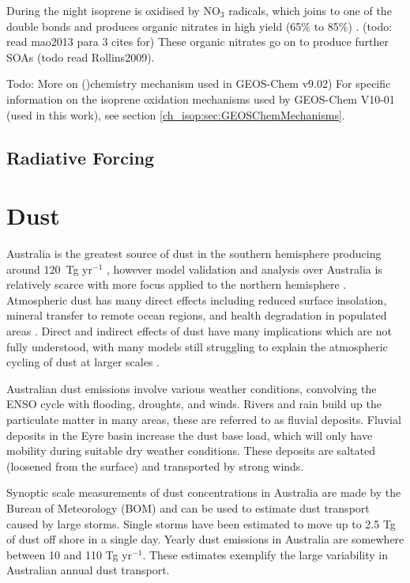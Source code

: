     During the night isoprene is oxidised by NO$_3$ radicals, which joins to one of the double bonds and produces organic nitrates in high yield (65\% to 85\%) \citep{Mao2013}. (todo: read mao2013 para 3 cites for)
    These organic nitrates go on to produce further SOAs \citep{Rollins2009} (todo read Rollins2009).
  
    Todo: More on \citep{Mao2013} ()chemistry mechanism used in GEOS-Chem v9.02)
    For specific information on the isoprene oxidation mechanisms used by GEOS-Chem V10-01 (used in this work), see section \ref{ch_isop:sec:GEOSChemMechanisms}.
  
  \subsection{Radiative Forcing}

    
\section{Dust}
\label{ch_LitRev:sec:dust}

  Australia is the greatest source of dust in the southern hemisphere producing around 120~Tg yr$^{-1}$ \citep{Li2008}, however model validation and analysis over Australia is relatively scarce with more focus applied to the northern hemisphere \citep{Fairlie2007, Ridley2013}.
  Atmospheric dust has many direct effects including reduced surface insolation, mineral transfer to remote ocean regions, and health degradation in populated areas \citep{Shao2007}.
  Direct and indirect effects of dust have many implications which are not fully understood, with many models still struggling to explain the atmospheric cycling of dust at larger scales \citep{Rotstayn2011}.

  Australian dust emissions involve various weather conditions, convolving the ENSO cycle with flooding, droughts, and winds.
  Rivers and rain build up the particulate matter in many areas, these are referred to as fluvial deposits.
  Fluvial deposits in the Eyre basin increase the dust base load, which will only have mobility during suitable dry weather conditions.
  These deposits are saltated (loosened from the surface) and transported by strong winds\citep{Zender2003}.

  Synoptic scale measurements of dust concentrations in Australia are made by the Bureau of Meteorology (BOM) and can be used to estimate dust transport caused by large storms. 
  Single storms have been estimated to move up to 2.5 Tg of dust off shore in a single day.
  Yearly dust emissions in Australia are somewhere between 10 and 110 Tg yr$^{-1}$.
  These estimates exemplify the large variability in Australian annual dust transport.

